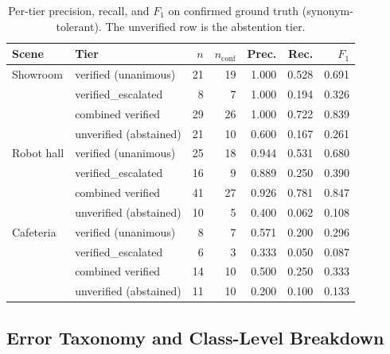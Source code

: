 \begin{table}[htbp]
\centering
\caption{Per-tier precision, recall, and $F_1$ on confirmed ground truth
(synonym-tolerant). The unverified row is the abstention tier.}
\label{tab:tierrf}
\small{}
\begin{tabular}{l l r r r r r}
\toprule
\textbf{Scene} & \textbf{Tier} & $n$ & $n_{\mathrm{conf}}$ & Prec. & Rec. & $F_1$ \\
\midrule
Showroom & verified (unanimous) & 21 & 19 & 1.000 & 0.528 & 0.691 \\
 & verified\_escalated & 8 & 7 & 1.000 & 0.194 & 0.326 \\
 & combined verified & 29 & 26 & 1.000 & 0.722 & 0.839 \\
 & unverified (abstained) & 21 & 10 & 0.600 & 0.167 & 0.261 \\
\midrule
Robot hall & verified (unanimous) & 25 & 18 & 0.944 & 0.531 & 0.680 \\
 & verified\_escalated & 16 & 9 & 0.889 & 0.250 & 0.390 \\
 & combined verified & 41 & 27 & 0.926 & 0.781 & 0.847 \\
 & unverified (abstained) & 10 & 5 & 0.400 & 0.062 & 0.108 \\
\midrule
Cafeteria & verified (unanimous) & 8 & 7 & 0.571 & 0.200 & 0.296 \\
 & verified\_escalated & 6 & 3 & 0.333 & 0.050 & 0.087 \\
 & combined verified & 14 & 10 & 0.500 & 0.250 & 0.333 \\
 & unverified (abstained) & 11 & 10 & 0.200 & 0.100 & 0.133 \\
\bottomrule
\end{tabular}
\end{table}

\subsection{Error Taxonomy and Class-Level Breakdown}
\label{subsec:exp-errors}

